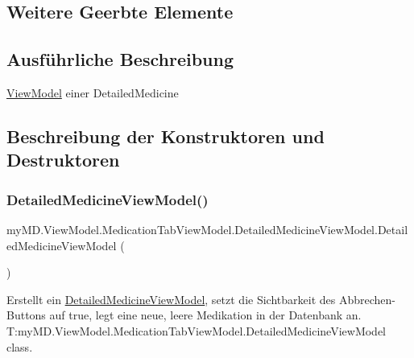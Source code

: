 \subsection*{Weitere Geerbte Elemente}


\subsection{Ausführliche Beschreibung}
\mbox{\hyperlink{namespacemy_m_d_1_1_view_model}{View\+Model}} einer Detailed\+Medicine 



\subsection{Beschreibung der Konstruktoren und Destruktoren}
\mbox{\label{classmy_m_d_1_1_view_model_1_1_medication_tab_view_model_1_1_detailed_medicine_view_model_a72a7e47668456e870fe1345d67c92f17}} 
\subsubsection{\texorpdfstring{Detailed\+Medicine\+View\+Model()}{DetailedMedicineViewModel()}\hspace{0.1cm}{\footnotesize\ttfamily [1/2]}}
{\footnotesize\ttfamily my\+M\+D.\+View\+Model.\+Medication\+Tab\+View\+Model.\+Detailed\+Medicine\+View\+Model.\+Detailed\+Medicine\+View\+Model (\begin{DoxyParamCaption}{ }\end{DoxyParamCaption})}



Erstellt ein \mbox{\hyperlink{classmy_m_d_1_1_view_model_1_1_medication_tab_view_model_1_1_detailed_medicine_view_model}{Detailed\+Medicine\+View\+Model}}, setzt die Sichtbarkeit des Abbrechen-\/\+Buttons auf true, legt eine neue, leere Medikation in der Datenbank an. ~\newline
T\+:my\+M\+D.\+View\+Model.\+Medication\+Tab\+View\+Model.\+Detailed\+Medicine\+View\+Model class. 

